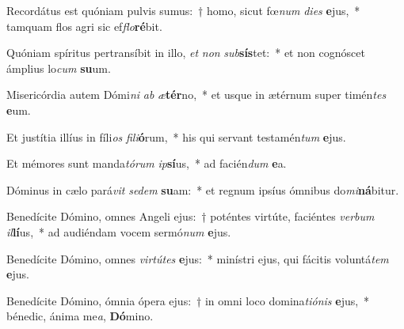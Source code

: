 \item Recordátus est quóniam pulvis sumus:~† homo, sicut fœ\textit{num} \textit{di}\textit{es} \textbf{e}jus,~* tamquam flos agri sic ef\textit{flo}\textbf{ré}bit.
\item Quóniam spíritus pertransíbit in illo, \textit{et} \textit{non} \textit{sub}\textbf{sís}tet:~* et non cognóscet ámplius lo\textit{cum} \textbf{su}um.
\item Misericórdia autem Dómi\textit{ni} \textit{ab} \textit{æ}\textbf{tér}no,~* et usque in ætérnum super timén\textit{tes} \textbf{e}um.
\item Et justítia illíus in fíli\textit{os} \textit{fi}\textit{li}\textbf{ó}rum,~* his qui servant testamén\textit{tum} \textbf{e}jus.
\item Et mémores sunt manda\textit{tó}\textit{rum} \textit{ip}\textbf{sí}us,~* ad facién\textit{dum} \textbf{e}a.
\item Dóminus in cælo pará\textit{vit} \textit{se}\textit{dem} \textbf{su}am:~* et regnum ipsíus ómnibus do\textit{mi}\textbf{ná}bitur.
\item Benedícite Dómino, omnes Angeli ejus:~† poténtes virtúte, faciéntes \textit{ver}\textit{bum} \textit{il}\textbf{lí}us,~* ad audiéndam vocem sermó\textit{num} \textbf{e}jus.
\item Benedícite Dómino, omnes \textit{vir}\textit{tú}\textit{tes} \textbf{e}jus:~* minístri ejus, qui fácitis voluntá\textit{tem} \textbf{e}jus.
\item Benedícite Dómino, ómnia ópera ejus:~† in omni loco domina\textit{ti}\textit{ó}\textit{nis} \textbf{e}jus,~* bénedic, ánima me\textit{a}, \textbf{Dó}mino.
